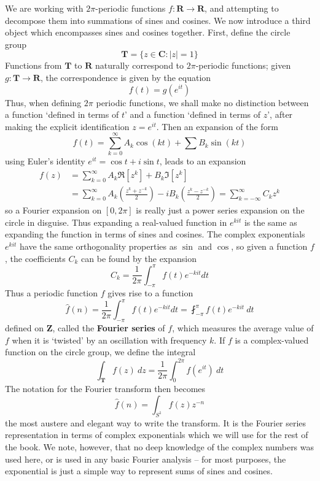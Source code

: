 We are working with $2 \pi$-periodic functions $f: \mathbf{R} \to \mathbf{R}$, and attempting to decompose them into summations of sines and cosines. We now introduce a third object which encompasses sines and cosines together. First, define the circle group
%
\[ \mathbf{T} = \{ z \in \mathbf{C} : |z| = 1 \} \]
%
Functions from $\mathbf{T}$ to $\mathbf{R}$ naturally correspond to $2 \pi$-periodic functions; given $g: \mathbf{T} \to \mathbf{R}$, the correspondence is given by the equation
%
\[ f(t) = g(e^{it}) \]
%
Thus, when defining $2\pi$ periodic functions, we shall make no distinction between a function `defined in terms of $t$' and a function `defined in terms of $z$', after making the explicit identification $z = e^{it}$. Then an expansion of the form
%
\[ f(t) = \sum_{k = 0}^\infty A_k \cos(kt) + \sum B_k \sin(kt) \]
%
using Euler's identity $e^{it} = \cos t + i \sin t$, leads to an expansion
%
\begin{align*}
    f(z) &= \sum_{k = 0}^\infty A_k \Re[z^k] + B_k \Im[z^k]\\
    &= \sum_{k = 0}^\infty A_k \left( \frac{z^k + z^{-k}}{2} \right) - i B_k \left( \frac{z^k - z^{-k}}{2} \right) = \sum_{k = -\infty}^\infty C_k z^k
\end{align*}
%
so a Fourier expansion on $[0,2\pi]$ is really just a power series expansion on the circle in disguise. Thus expanding a real-valued function in $e^{kit}$ is the same as expanding the function in terms of sines and cosines. The complex exponentials $e^{kit}$ have the same orthogonality properties as $\sin$ and $\cos$, so given a function $f$, the coefficients $C_k$ can be found by the expansion
%
\[ C_k = \frac{1}{2\pi} \int_{-\pi}^\pi f(t) e^{-kit} dt \]
%
Thus a periodic function $f$ gives rise to a function
%
\[ \widehat{f}(n) = \frac{1}{2\pi} \int_{-\pi}^\pi f(t) e^{-kit} dt = \fint_{-\pi}^\pi f(t) e^{-kit}\ dt \]
%
defined on $\mathbf{Z}$, called the {\bf Fourier series} of $f$, which measures the average value of $f$ when it is `twisted' by an oscillation with frequency $k$. If $f$ is a complex-valued function on the circle group, we define the integral
%
\[ \int_{\mathbf{T}} f(z)\ dz = \frac{1}{2\pi} \int_0^{2\pi} f(e^{it})\ dt \]
%
The notation for the Fourier transform then becomes
%
\[ \widehat{f}(n) = \int_{S^1} f(z) z^{-n} \]
%
the most austere and elegant way to write the transform. It is the Fourier series representation in terms of complex exponentials which we will use for the rest of the book. We note, however, that no deep knowledge of the complex numbers was used here, or is used in any basic Fourier analysis -- for most purposes, the exponential is just a simple way to represent sums of sines and cosines.


